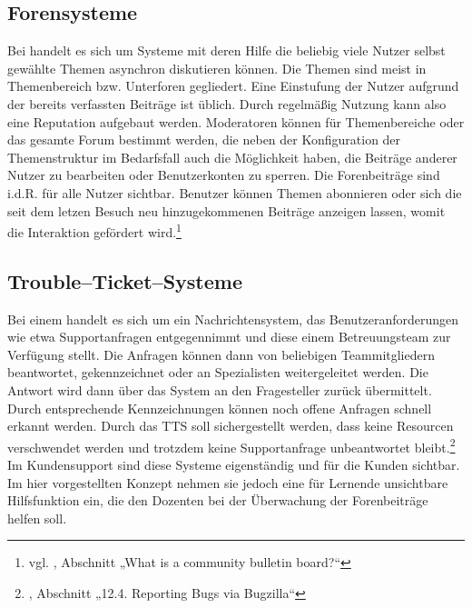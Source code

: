 \subsection{Forensysteme} %
\label{sub:forensysteme}
Bei  handelt es sich um Systeme mit deren Hilfe die beliebig viele Nutzer selbst gewählte Themen asynchron diskutieren können. Die Themen sind meist in Themenbereich bzw. Unterforen gegliedert. Eine Einstufung der Nutzer aufgrund der bereits verfassten Beiträge ist üblich. Durch regelmäßig Nutzung kann also eine Reputation aufgebaut werden. Moderatoren können für Themenbereiche oder das gesamte Forum bestimmt werden, die neben der Konfiguration der Themenstruktur im Bedarfsfall auch die Möglichkeit haben, die Beiträge anderer Nutzer zu bearbeiten oder Benutzerkonten zu sperren. Die Forenbeiträge sind i.d.R. für alle Nutzer sichtbar. Benutzer können Themen abonnieren oder sich die seit dem letzen Besuch neu hinzugekommenen Beiträge anzeigen lassen, womit die Interaktion gefördert wird.\footnote{vgl. \cite{vbulletin}, Abschnitt „What is a community bulletin board?“}

\subsection{Trouble–Ticket–Systeme} %
\label{sub:trouble_ticket_systmee}
Bei einem  handelt es sich um ein Nachrichtensystem, das Benutzeranforderungen wie etwa Supportanfragen entgegennimmt und diese einem Betreuungsteam zur Verfügung stellt. Die Anfragen können dann von beliebigen Teammitgliedern beantwortet, gekennzeichnet oder an Spezialisten weitergeleitet werden. Die Antwort wird dann über das System an den Fragesteller zurück übermittelt. Durch entsprechende Kennzeichnungen können noch offene Anfragen schnell erkannt werden. Durch das \ac{TTS} soll sichergestellt werden, dass keine Resourcen verschwendet werden und trotzdem keine Supportanfrage unbeantwortet bleibt.\footnote{\cite{nna}, Abschnitt „12.4. Reporting Bugs via Bugzilla“} Im Kundensupport sind diese Systeme eigenständig und für die Kunden sichtbar. Im hier vorgestellten Konzept nehmen sie jedoch eine für Lernende unsichtbare Hilfsfunktion ein, die den Dozenten bei der Überwachung der Forenbeiträge helfen soll.

